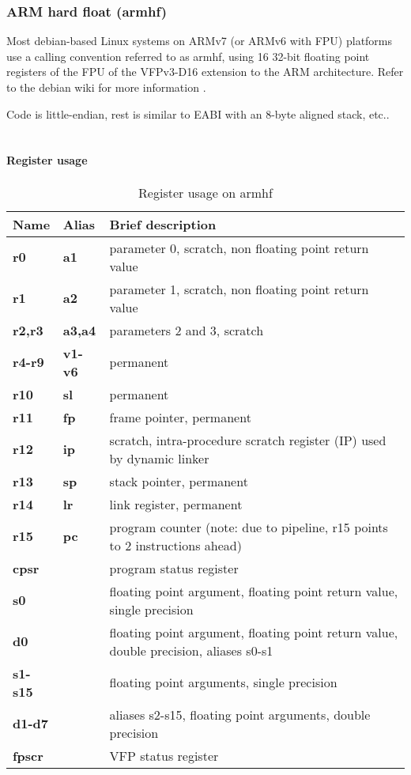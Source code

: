\clearpage


\subsubsection{ARM hard float (armhf)}


Most debian-based Linux systems on ARMv7 (or ARMv6 with FPU) platforms use a calling convention referred to
as armhf, using 16 32-bit floating point registers of the FPU of the VFPv3-D16 extension to the ARM architecture.
Refer to the debian wiki for more information \cite{armhf}. %

Code is little-endian, rest is similar to EABI with an 8-byte aligned stack, etc..\\
\\
\paragraph{Register usage}

\begin{table}[h]
\begin{tabular*}{0.95\textwidth}{lll}
Name         & Alias       &  Brief description\\
\hline          
{\bf r0}     & {\bf a1}    &  parameter 0, scratch, non floating point return value\\
{\bf r1}     & {\bf a2}    &  parameter 1, scratch, non floating point return value\\
{\bf r2,r3}  & {\bf a3,a4} &  parameters 2 and 3, scratch\\
{\bf r4-r9}  & {\bf v1-v6} &  permanent\\
{\bf r10}    & {\bf sl}    &  permanent\\
{\bf r11}    & {\bf fp}    &  frame pointer, permanent\\
{\bf r12}    & {\bf ip}    &  scratch, intra-procedure scratch register (IP) used by dynamic linker\\
{\bf r13}    & {\bf sp}    &  stack pointer, permanent\\
{\bf r14}    & {\bf lr}    &  link register, permanent\\
{\bf r15}    & {\bf pc}    &  program counter (note: due to pipeline, r15 points to 2 instructions ahead)\\
{\bf cpsr}   &             &  program status register\\
{\bf s0}     &             &  floating point argument, floating point return value, single precision\\
{\bf d0}     &             &  floating point argument, floating point return value, double precision, aliases s0-s1\\
{\bf s1-s15} &             &  floating point arguments, single precision\\
{\bf d1-d7}  &             &  aliases s2-s15, floating point arguments, double precision\\
{\bf fpscr}  &             &  VFP status register\\
\end{tabular*}
\caption{Register usage on armhf}
\end{table}

